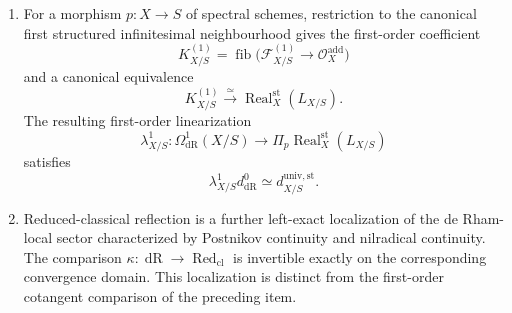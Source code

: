 \begin{theorem}
\begin{enumerate}[label=(\roman*)]
  \item For a morphism \(p:X\to S\) of spectral schemes, restriction to the
  canonical first structured infinitesimal neighbourhood gives the first-order
  coefficient
  \[
    K^{(1)}_{X/S}
    =
    \operatorname{fib}
    \bigl(
      \mathscr F^{(1)}_{X/S}
      \longrightarrow
      \mathcal O_X^{\mathrm{add}}
    \bigr)
  \]
  and a canonical equivalence
  \[
    K^{(1)}_{X/S}
    \xrightarrow{\simeq}
    \operatorname{Real}^{\mathrm{st}}_X(L_{X/S}).
  \]
  The resulting first-order linearization
  \[
    \lambda^1_{X/S}:
    \Omega^1_{\mathrm{dR}}(X/S)
    \longrightarrow
    \Pi_p\operatorname{Real}^{\mathrm{st}}_X(L_{X/S})
  \]
  satisfies
  \[
    \lambda^1_{X/S}d^0_{\mathrm{dR}}
    \simeq
    d^{\mathrm{univ,st}}_{X/S}.
  \]
\item Reduced-classical reflection is a further left-exact localization of the
  de Rham-local sector characterized by Postnikov continuity and nilradical
  continuity. The comparison
  \(\kappa:\operatorname{dR}\to\operatorname{Red}_{\mathrm{cl}}\) is invertible
  exactly on the corresponding convergence domain. This localization is
  distinct from the first-order cotangent comparison of the preceding item.
\end{enumerate}
\end{theorem}

